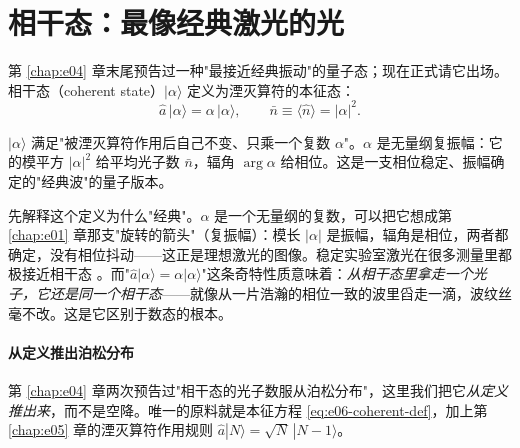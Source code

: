 \section{相干态：最像经典激光的光}
\label{sec:e06-coherent}

第 \ref{chap:e04} 章末尾预告过一种"最接近经典振动"的量子态；现在正式请它出场。相干态（coherent state）\(|\alpha\rangle\) 定义为湮灭算符的本征态：
\begin{equation}
  \hat a\,|\alpha\rangle=\alpha\,|\alpha\rangle,
  \qquad
  \bar n\equiv\langle\hat n\rangle=|\alpha|^{2}.
  \label{eq:e06-coherent-def}
\end{equation}
\begin{formulaexplain}
\(|\alpha\rangle\) 满足"被湮灭算符作用后自己不变、只乘一个复数 \(\alpha\)"。\(\alpha\) 是无量纲复振幅：它的模平方 \(|\alpha|^2\) 给平均光子数 \(\bar n\)，辐角 \(\arg\alpha\) 给相位。这是一支相位稳定、振幅确定的"经典波"的量子版本。
\end{formulaexplain}

先解释这个定义为什么"经典"。\(\alpha\) 是一个无量纲的复数，可以把它想成第 \ref{chap:e01} 章那支"旋转的箭头"（复振幅）：模长 \(|\alpha|\) 是振幅，辐角是相位，两者都确定，没有相位抖动——这正是理想激光的图像。稳定实验室激光在很多测量里都极接近相干态 \citep{1963PhRv..131.2766G}。而"\(\hat a|\alpha\rangle=\alpha|\alpha\rangle\)"这条奇特性质意味着：\emph{从相干态里拿走一个光子，它还是同一个相干态}——就像从一片浩瀚的相位一致的波里舀走一滴，波纹丝毫不改。这是它区别于数态的根本。

\paragraph{从定义推出泊松分布}
\label{sec:e06-coherent-poisson}

第 \ref{chap:e04} 章两次预告过"相干态的光子数服从泊松分布"，这里我们把它\emph{从定义推出来}，而不是空降。唯一的原料就是本征方程 \eqref{eq:e06-coherent-def}，加上第 \ref{chap:e05} 章的湮灭算符作用规则 \(\hat a|N\rangle=\sqrt{N}\,|N-1\rangle\)。

